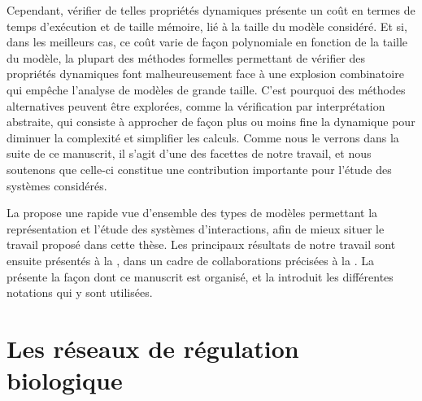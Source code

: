 Cependant, vérifier de telles propriétés dynamiques présente un coût
en termes de temps d'exécution et de taille mémoire,
lié à la taille du modèle considéré.
Et si, dans les meilleurs cas, ce coût varie de façon polynomiale
en fonction de la taille du modèle,
la plupart des méthodes formelles permettant de vérifier des propriétés dynamiques
font malheureusement face à une explosion combinatoire
qui empêche l'analyse de modèles de grande taille.
C'est pourquoi des méthodes alternatives peuvent être explorées,
comme la vérification par interprétation abstraite,
qui consiste à approcher de façon plus ou moins fine
la dynamique pour diminuer la complexité et simplifier les calculs.
Comme nous le verrons dans la suite de ce manuscrit,
il s'agit d'une des facettes de notre travail,
et nous soutenons que celle-ci constitue une contribution importante
pour l'étude des systèmes considérés.



La  propose une rapide vue d'ensemble des types de modèles permettant
la représentation et l'étude des systèmes d'interactions,
afin de mieux situer le travail proposé dans cette thèse.
Les principaux résultats de notre travail sont ensuite présentés à la ,
dans un cadre de collaborations précisées à la .
La  présente la façon dont ce manuscrit est organisé,
et la  introduit les différentes notations qui y sont utilisées.



\section{Les réseaux de régulation biologique}



